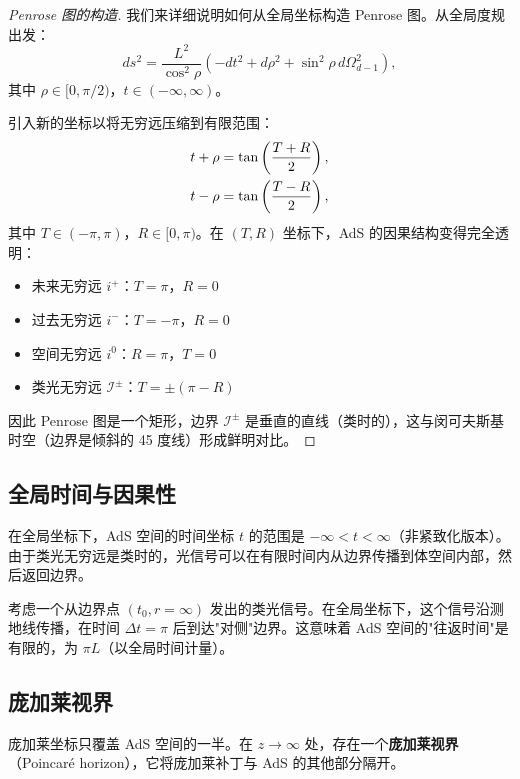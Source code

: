 \begin{proof}[Penrose 图的构造]
我们来详细说明如何从全局坐标构造 Penrose 图。从全局度规出发：
\begin{equation}
    ds^2 = \frac{L^2}{\cos^2\rho}\left(-dt^2 + d\rho^2 + \sin^2\rho \, d\Omega_{d-1}^2\right),
\end{equation}
其中 $\rho \in [0, \pi/2)$，$t \in (-\infty, \infty)$。

引入新的坐标以将无穷远压缩到有限范围：
\begin{align}
    t + \rho &= \tan\left(\frac{T+R}{2}\right), \notag \\
    t - \rho &= \tan\left(\frac{T-R}{2}\right),
\end{align}
其中 $T \in (-\pi, \pi)$，$R \in [0, \pi)$。在 $(T, R)$ 坐标下，AdS 的因果结构变得完全透明：
\begin{itemize}
    \item 未来无穷远 $i^+$：$T = \pi$，$R = 0$
    \item 过去无穷远 $i^-$：$T = -\pi$，$R = 0$
    \item 空间无穷远 $i^0$：$R = \pi$，$T = 0$
    \item 类光无穷远 $\mathscr{I}^\pm$：$T = \pm(\pi - R)$
\end{itemize}
因此 Penrose 图是一个矩形，边界 $\mathscr{I}^\pm$ 是垂直的直线（类时的），这与闵可夫斯基时空（边界是倾斜的 45 度线）形成鲜明对比。
\end{proof}

\subsection{全局时间与因果性}

在全局坐标下，AdS 空间的时间坐标 $t$ 的范围是 $-\infty < t < \infty$（非紧致化版本）。由于类光无穷远是类时的，光信号可以在有限时间内从边界传播到体空间内部，然后返回边界。

考虑一个从边界点 $(t_0, r = \infty)$ 发出的类光信号。在全局坐标下，这个信号沿测地线传播，在时间 $\Delta t = \pi$ 后到达"对侧"边界。这意味着 AdS 空间的"往返时间"是有限的，为 $\pi L$（以全局时间计量）。

\subsection{庞加莱视界}

庞加莱坐标只覆盖 AdS 空间的一半。在 $z \to \infty$ 处，存在一个\textbf{庞加莱视界}（Poincaré horizon），它将庞加莱补丁与 AdS 的其他部分隔开。

